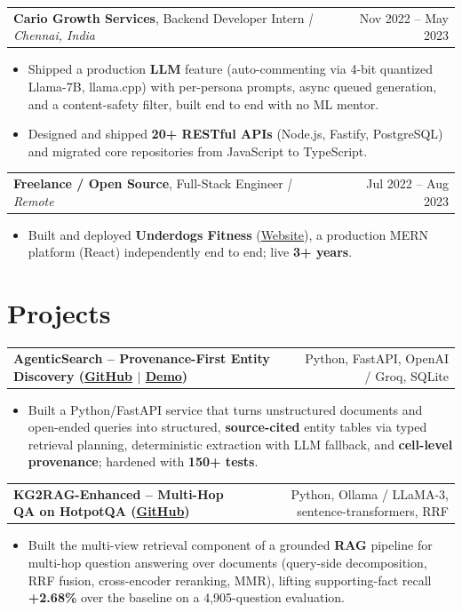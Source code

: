 \documentclass[letterpaper,11pt]{article}
\makeatletter
\newcommand{\expItem}[4]{%
  \vspace{3pt}
  \begin{tabular*}{\textwidth}{@{}l@{\extracolsep{\fill}}r@{}}
    \textbf{#1}, #2 \textit{| #3} & #4 \\
  \end{tabular*}\par\vspace{-2pt}
}
\newcommand{\projItem}[2]{%
  \vspace{6pt}
  \begin{tabular*}{\textwidth}{@{}l@{\extracolsep{\fill}}r@{}}
    \textbf{#1} & #2 \\
  \end{tabular*}\par\vspace{-2pt}
}
\makeatother
\begin{document}
\expItem{Cario Growth Services}{Backend Developer Intern}{Chennai, India}{Nov 2022 -- May 2023}
\begin{itemize}
  \item Shipped a production \textbf{LLM} feature (auto-commenting via 4-bit quantized Llama-7B, llama.cpp) with per-persona prompts, async queued generation, and a content-safety filter, built end to end with no ML mentor.
  \item Designed and shipped \textbf{20+ RESTful APIs} (Node.js, Fastify, PostgreSQL) and migrated core repositories from JavaScript to TypeScript.
\end{itemize}

\expItem{Freelance / Open Source}{Full-Stack Engineer}{Remote}{Jul 2022 -- Aug 2023}
\begin{itemize}
  \item Built and deployed \textbf{Underdogs Fitness} (\href{https://www.underdogsfitness.in/}{Website}), a production MERN platform (React) independently end to end; live \textbf{3+ years}.
\end{itemize}

\section{Projects}

\projItem{AgenticSearch -- Provenance-First Entity Discovery {\normalfont\small(\href{https://github.com/Deva-1903/ciir_agentic_search}{GitHub} $\vert$ \href{https://agentic-search-negglszkwa-uc.a.run.app}{Demo})}}{Python, FastAPI, OpenAI / Groq, SQLite}
\begin{itemize}
  \item Built a Python/FastAPI service that turns unstructured documents and open-ended queries into structured, \textbf{source-cited} entity tables via typed retrieval planning, deterministic extraction with LLM fallback, and \textbf{cell-level provenance}; hardened with \textbf{150+ tests}.
\end{itemize}

\projItem{KG2RAG-Enhanced -- Multi-Hop QA on HotpotQA {\normalfont\small(\href{https://github.com/Deva-1903/KG2RAG-685-NLP}{GitHub})}}{Python, Ollama / LLaMA-3, sentence-transformers, RRF}
\begin{itemize}
  \item Built the multi-view retrieval component of a grounded \textbf{RAG} pipeline for multi-hop question answering over documents (query-side decomposition, RRF fusion, cross-encoder reranking, MMR), lifting supporting-fact recall \textbf{+2.68\%} over the baseline on a 4{,}905-question evaluation.
\end{itemize}
\end{document}

